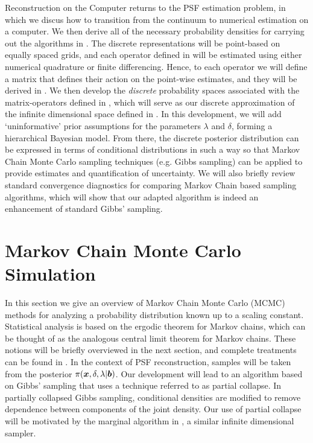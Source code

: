 \begin{chapter}{Reconstruction on the Computer}
 returns to the PSF estimation problem, in which we discus how to transition from the continuum to numerical estimation on a computer.
We then derive all of the necessary probability densities for carrying out the algorithms in .
The discrete representations will be point-based on equally spaced grids, and each operator defined in  will be estimated using either numerical quadrature or finite differencing.
Hence, to each operator we will define a matrix that defines their action on the point-wise estimates, and they will be derived in .
We then develop the \emph{discrete} probability spaces associated with the matrix-operators defined in , which will serve as our discrete approximation of the infinite dimensional space defined in .
In this development, we will add `uninformative' prior assumptions for the parameters $\lambda$ and $\delta$, forming a hierarchical Bayesian model.
From there, the discrete posterior distribution can be expressed in terms of conditional distributions in such a way so that Markov Chain Monte Carlo sampling techniques (e.g. Gibbs sampling) can be applied to provide estimates and quantification of uncertainty.
We will also briefly review standard convergence diagnostics for comparing Markov Chain based sampling algorithms, which will show that our adapted algorithm is indeed an enhancement of standard Gibbs' sampling.


\section{Markov Chain Monte Carlo Simulation} \label{sec:pcgibbs}
In this section we give an overview of Markov Chain Monte Carlo (MCMC) methods for analyzing a probability distribution known up to a scaling constant.
Statistical analysis is based on the ergodic theorem for Markov chains, which can be thought of as the analogous central limit theorem for Markov chains. 
These notions will be briefly overviewed in the next section, and complete treatments can be found in \citep{robert2013monte,liu2008monte}.
In the context of PSF reconstruction, samples will be taken from the posterior $\pi(\mbox{\boldmath$x$},\delta,\lambda|\mbox{\boldmath$b$})$.
Our development will lead to an algorithm based on Gibbs' sampling that uses a technique referred to as partial collapse.  
In partially collapsed Gibbs sampling, conditional densities are modified to remove dependence between components of the joint density.
Our use of partial collapse will be motivated by the marginal algorithm in \citep{agapiou2014analysis}, a similar infinite dimensional sampler.


\end{chapter}
